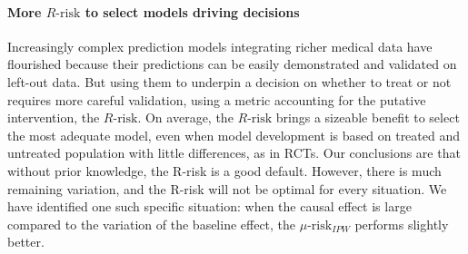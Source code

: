\documentclass[a4paper,num-refs]{oup-contemporary}%
\begin{document}

\paragraph{More $R\text{-risk}$ to select models driving decisions}

Increasingly complex prediction models integrating richer medical data
have flourished because their predictions can be easily
demonstrated and validated on left-out data. But using them to underpin a
decision on whether to treat or not requires more careful validation,
using a metric accounting for the
putative intervention, the $R\text{-risk}$. On average, the $R\text{-risk}$
brings a sizeable benefit to select the most adequate model, even when
model development is based on treated and
untreated population with little differences, as in RCTs.
%
Our conclusions are that without prior knowledge, the R-risk is a good
default. However, there is much remaining variation, and the R-risk will
not be optimal for every situation. We have identified one such specific
situation: when the causal effect is large compared to the variation of
the baseline effect, the $\mu\text{-risk}_{IPW}$ performs slightly
better.

\end{document}
